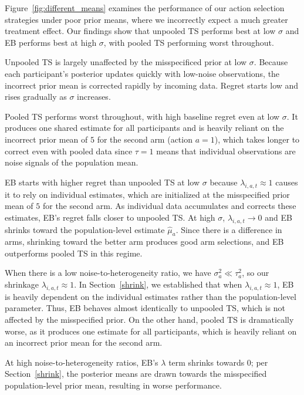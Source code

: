 \documentclass[letterpaper, 9pt]{extarticle}
\begin{document}
Figure~\ref{fig:different_means} examines the performance of our action selection strategies under poor prior means, where we incorrectly expect a much greater treatment effect. Our findings show that unpooled TS performs best at low $\sigma$ and EB performs best at high $\sigma$, with pooled TS performing worst throughout.

Unpooled TS is largely unaffected by the misspecificed prior at low $\sigma$. Because each participant's posterior updates quickly with low-noise observations, the incorrect prior mean is corrected rapidly by incoming data. Regret starts low and rises gradually as $\sigma$ increases.

Pooled TS performs worst throughout, with high baseline regret even at low $\sigma$. It produces one shared estimate for all participants and is heavily reliant on the incorrect prior mean of $5$ for the second arm (action $a=1$), which takes longer to correct even with pooled data since $\tau = 1$ means that individual observations are noise signals of the population mean.

EB starts with higher regret than unpooled TS at low $\sigma$ because $\lambda_{i,a,t} \approx 1$ causes it to rely on individual estimates, which are initialized at the misspecified prior mean of $5$ for the second arm. As individual data accumulates and corrects these estimates, EB's regret falls closer to unpooled TS. At high $\sigma$, $\lambda_{i,a,t} \rightarrow 0$ and EB shrinks toward the population-level estimate $\hat{\mu}_a$. Since there is a difference in arms, shrinking toward the better arm produces good arm selections, and EB outperforms pooled TS in this regime. 

When there is a low noise-to-heterogeneity ratio, we have $\sigma_a^2 \ll \tau_a^2$, so our shrinkage $\lambda_{i,a,t} \approx 1$. In Section~\ref{shrink}, we established that when $\lambda_{i,a,t} \approx 1$, EB is heavily dependent on the individual estimates rather than the population-level parameter. Thus, EB behaves almost identically to unpooled TS, which is not affected by the misspecified prior. On the other hand, pooled TS is dramatically worse, as it produces one estimate for all participants, which is heavily reliant on an incorrect prior mean for the second arm. 

At high noise-to-heterogeneity ratios, EB's $\lambda$ term shrinks towards 0; per Section~\ref{shrink}, the posterior means are drawn towards the misspecified population-level prior mean, resulting in worse performance.
\end{document}
